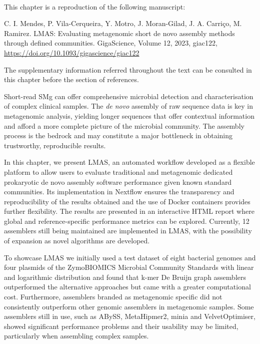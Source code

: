 \mbox{}\\
\vspace{8cm}

This chapter is a reproduction of the following manuscript:

C. I. Mendes, P. Vila-Cerqueira, Y. Motro, J. Moran-Gilad, J. A. Carriço, M. Ramirez. LMAS: Evaluating metagenomic short de novo assembly methods through defined communities. GigaScience, Volume 12, 2023, giac122, \url{https://doi.org/10.1093/gigascience/giac122}

The supplementary information referred throughout the text can be consulted in this chapter before the section of references.

Short-read \ac{SMg} can offer comprehensive microbial detection and characterisation of complex clinical samples. The \textit{de novo} assembly of raw sequence data is key in metagenomic analysis, yielding longer sequences that offer contextual information and afford a more complete picture of the microbial community. The assembly process is the bedrock and may constitute a major bottleneck in obtaining trustworthy, reproducible results.

In this chapter, we present LMAS, an automated workflow developed as a flexible platform to allow users to evaluate traditional and metagenomic dedicated prokaryotic de novo assembly software performance given known standard communities. Its implementation in Nextflow ensures the transparency and reproducibility of the results obtained and the use of Docker containers provides further flexibility. The results are presented in an interactive HTML report where global and reference-specific performance metrics can be explored. Currently, 12 assemblers still being maintained are implemented in LMAS, with the possibility of expansion as novel algorithms are developed.

To showcase LMAS we initially used a test dataset of eight bacterial genomes and four plasmids of the ZymoBIOMICS Microbial Community Standards with linear and logarithmic distribution and found that k-mer De Bruijn graph assemblers outperformed the alternative approaches but came with a greater computational cost. Furthermore, assemblers branded as metagenomic specific did not consistently outperform other genomic assemblers in metagenomic samples. Some assemblers still in use, such as ABySS, MetaHipmer2, minia and VelvetOptimiser,  showed significant performance problems and their usability may be limited, particularly when assembling complex samples. 

